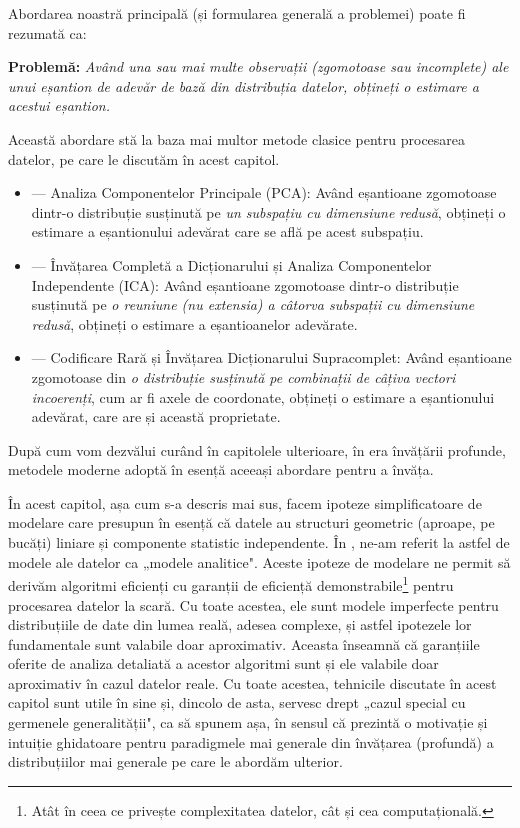 \documentclass[../../book-main_ro.tex]{subfiles}
\begin{document}
Abordarea noastră principală (și formularea generală a problemei) poate fi rezumată ca:
\begin{tcolorbox}\centering
    \textbf{Problemă:} \textit{Având una sau mai multe observații (zgomotoase sau incomplete) ale unui eșantion de adevăr de bază din distribuția datelor, obțineți o estimare a acestui eșantion.}
\end{tcolorbox}
Această abordare stă la baza mai multor metode clasice pentru procesarea datelor, pe care le discutăm în acest capitol.
\begin{itemize}
    \item {} --- Analiza Componentelor Principale (PCA): Având eșantioane zgomotoase dintr-o distribuție susținută pe {\em un subspațiu cu dimensiune redusă}, obțineți o estimare a eșantionului adevărat care se află pe acest subspațiu.
    \item  {} --- Învățarea Completă a Dicționarului și Analiza Componentelor Independente (ICA): Având eșantioane zgomotoase dintr-o distribuție susținută pe {\em o reuniune (\textit{nu} extensia) a câtorva subspații cu dimensiune redusă}, obțineți o estimare a eșantioanelor adevărate.
    \item {} --- Codificare Rară și Învățarea Dicționarului Supracomplet: Având eșantioane zgomotoase din {\em o distribuție susținută pe combinații de câțiva vectori incoerenți}, cum ar fi axele de coordonate, obțineți o estimare a eșantionului adevărat, care are și această proprietate.
\end{itemize}
După cum vom dezvălui curând în capitolele ulterioare, în era învățării profunde, metodele moderne adoptă în esență aceeași abordare pentru a învăța.

În acest capitol, așa cum s-a descris mai sus, facem ipoteze simplificatoare de modelare care presupun în esență că datele au structuri geometric (aproape, pe bucăți) liniare și componente statistic independente. În , ne-am referit la astfel de modele ale datelor ca „modele analitice". Aceste ipoteze de modelare ne permit să derivăm algoritmi eficienți cu garanții de eficiență demonstrabile\footnote{Atât în ceea ce privește complexitatea datelor, cât și cea computațională.} pentru procesarea datelor la scară. Cu toate acestea, ele sunt modele imperfecte pentru distribuțiile de date din lumea reală, adesea complexe, și astfel ipotezele lor fundamentale sunt valabile doar aproximativ. Aceasta înseamnă că garanțiile oferite de analiza detaliată a acestor algoritmi sunt și ele valabile doar aproximativ în cazul datelor reale. Cu toate acestea, tehnicile discutate în acest capitol sunt utile în sine și, dincolo de asta, servesc drept „cazul special cu germenele generalității", ca să spunem așa, în sensul că prezintă o motivație și intuiție ghidatoare pentru paradigmele mai generale din învățarea (profundă) a distribuțiilor mai generale pe care le abordăm ulterior. %
\end{document}
